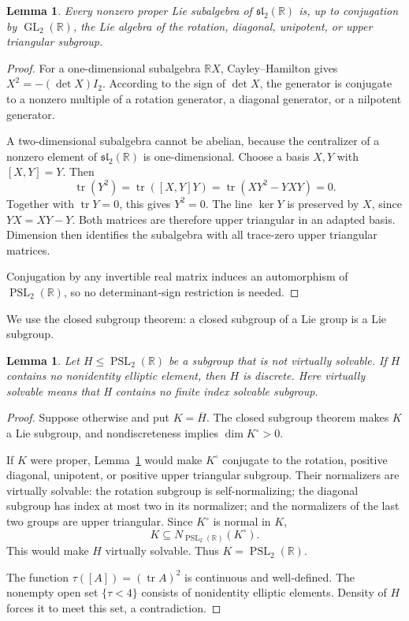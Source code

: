 \documentclass[11pt,reqno]{amsart}
\newcommand{\R}{\mathbb{R}}
\theoremstyle{plain}
\newtheorem{lemma}[theorem]{Lemma}
\theoremstyle{definition}
\theoremstyle{remark}
\numberwithin{equation}{section}
\DeclareMathOperator{\tr}{tr}
\begin{document}
\begin{lemma}\label{lem:sl2-subalgebras}
Every nonzero proper Lie subalgebra of $\mathfrak{sl}_2(\R)$ is, up to conjugation by $\operatorname{GL}_2(\R)$, the Lie algebra of the rotation, diagonal, unipotent, or upper triangular subgroup.
\end{lemma}
\begin{proof}
For a one-dimensional subalgebra $\R X$, Cayley--Hamilton gives $X^2=-(\det X)I_2$. According to the sign of $\det X$, the generator is conjugate to a nonzero multiple of a rotation generator, a diagonal generator, or a nilpotent generator.

A two-dimensional subalgebra cannot be abelian, because the centralizer of a nonzero element of $\mathfrak{sl}_2(\R)$ is one-dimensional. Choose a basis $X,Y$ with $[X,Y]=Y$. Then
\[
\tr(Y^2)=\tr([X,Y]Y)=\tr(XY^2-YXY)=0.
\]
Together with $\tr Y=0$, this gives $Y^2=0$. The line $\ker Y$ is preserved by $X$, since $YX=XY-Y$. Both matrices are therefore upper triangular in an adapted basis. Dimension then identifies the subalgebra with all trace-zero upper triangular matrices.

Conjugation by any invertible real matrix induces an automorphism of $\operatorname{PSL}_2(\R)$, so no determinant-sign restriction is needed.
\end{proof}

We use the closed subgroup theorem: a closed subgroup of a Lie group is a Lie subgroup.

\begin{lemma}\label{lem:discrete-projection}
Let $H\leq\operatorname{PSL}_2(\R)$ be a subgroup that is not virtually solvable. If $H$ contains no nonidentity elliptic element, then $H$ is discrete. Here virtually solvable means that H contains no finite index solvable subgroup.
\end{lemma}
\begin{proof}
Suppose otherwise and put $K=\overline H$. The closed subgroup theorem makes $K$ a Lie subgroup, and nondiscreteness implies $\dim K^\circ>0$.

If $K$ were proper, Lemma~\ref{lem:sl2-subalgebras} would make $K^\circ$ conjugate to the rotation, positive diagonal, unipotent, or positive upper triangular subgroup. Their normalizers are virtually solvable: the rotation subgroup is self-normalizing; the diagonal subgroup has index at most two in its normalizer; and the normalizers of the last two groups are upper triangular. Since $K^\circ$ is normal in $K$,
\[
K\subseteq N_{\operatorname{PSL}_2(\R)}(K^\circ).
\]
This would make $H$ virtually solvable. Thus $K=\operatorname{PSL}_2(\R)$.

The function $\tau([A])=(\tr A)^2$ is continuous and well-defined. The nonempty open set $\{\tau<4\}$ consists of nonidentity elliptic elements. Density of $H$ forces it to meet this set, a contradiction.
\end{proof}
\end{document}
